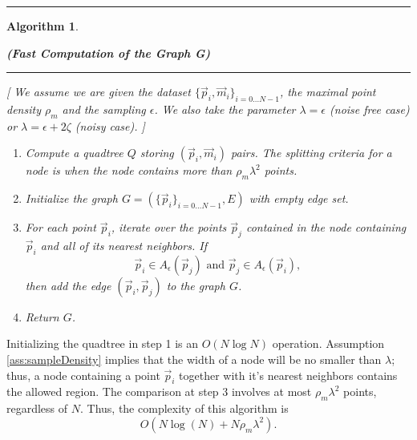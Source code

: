 \documentclass{article}
\newtheorem{algo}{Algorithm}
\numberwithin{cntr}{section}
\numberwithin{equation}{section}
\newcommand{\vp}[0]{{\vec{p}}}
\newcommand{\vm}[0]{{\vec{m}}}
\newcommand{\OtoN}{{0 \ldots N-1}}
\newcommand{\pointData}{{ \{ \vp_{i} \}_{i=\OtoN} }}
\newcommand{\allData}{{ \{ \vp_{i}, \vm_{i} \}_{i=\OtoN} }}
\newcommand{\allowed}[2]{ { A_{#1}(#2) } }
\newcommand{\pointNoise}{{\zeta}}
\newcommand{\densitymax}{{\rho_{m}}}
\begin{document}
\hrule
\begin{algo}
  \label{algo:polygonalization}
  \begin{center} {\bf (Fast Computation of the Graph G)}
  \end{center}

\vspace{.1in}

\hrule

\vspace{.2in}

[ We assume we are given the dataset $\allData$, the maximal point density $\densitymax$ and the sampling $\epsilon$. We also take the parameter $\lambda=\epsilon$ (noise free case) or $\lambda=\epsilon+2\pointNoise$ (noisy case). ]

\vspace{.1in}

  \begin{enumerate}
  \item Compute a quadtree $Q$ storing $(\vp_{i},\vm_{i})$ pairs. The splitting criteria for a node is when the node contains more than $\densitymax \lambda^{2}$ points.
  \item Initialize the graph $G = (\pointData, E)$ with empty edge set.
  \item For each point $\vp_{i}$, iterate over the points $\vp_{j}$ contained in the node containing $\vp_{i}$ and all of its nearest neighbors. If
    \begin{equation*}
      \vp_{i} \in \allowed{\epsilon}{\vp_{j}} \textrm{~and~} \vp_{j} \in \allowed{\epsilon}{\vp_{i}},
    \end{equation*}
    then add the edge $(\vp_{i},\vp_{j})$ to the graph $G$.
  \item Return $G$.
  \end{enumerate}
\end{algo}
Initializing the quadtree in step 1 is an $O(N \log N)$ operation. Assumption \ref{ass:sampleDensity} implies that the width of a node will be no smaller than $\lambda$; thus, a node containing a point $\vp_{i}$ together with it's nearest neighbors contains the allowed region. The comparison at step 3 involves at most $\densitymax \lambda^{2}$ points, regardless of $N$. Thus, the complexity of this algorithm is
\begin{equation}
  O(N \log(N) + N \densitymax \lambda^{2}).
\end{equation}
\end{document}
